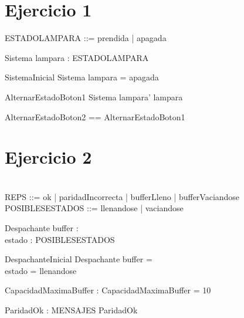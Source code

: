 \documentclass[11pt]{article}
\begin{document}
\section*{Ejercicio 1}

\begin{zed}
	ESTADOLAMPARA ::= prendida | apagada
\end{zed}

\begin{schema}{Sistema}
	lampara : ESTADOLAMPARA
\end{schema}

\begin{schema}{SistemaInicial}
Sistema
\where
lampara = apagada
\end{schema}

\begin{schema}{AlternarEstadoBoton1}
\Delta Sistema
\where
lampara' \neq lampara
\end{schema}

\begin{zed}
AlternarEstadoBoton2 == AlternarEstadoBoton1
\end{zed}

\section*{Ejercicio 2}

\begin{zed}
	[MENSAJES] \\
	REPS ::= ok | paridadIncorrecta | bufferLleno | bufferVaciandose \\
	POSIBLESESTADOS ::= llenandose | vaciandose
\end{zed}

\begin{schema}{Despachante}
buffer :  \\
estado : POSIBLESESTADOS
\end{schema}

\begin{schema}{DespachanteInicial}
Despachante
\where
buffer = \emptyset \\
estado = llenandose
\end{schema}

\begin{axdef} 
CapacidadMaximaBuffer : \nat
\where
CapacidadMaximaBuffer = 10
\end{axdef}

\begin{axdef}
ParidadOk : \power MENSAJES
\where
ParidadOk \neq \emptyset
\end{axdef}
\end{document}

